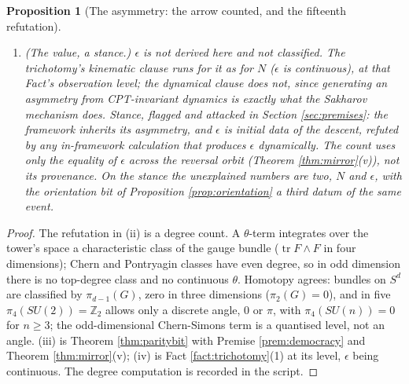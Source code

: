 \documentclass[11pt]{article}
\newtheorem{proposition}[theorem]{Proposition}
\theoremstyle{definition}
\newcommand{\tr}{\operatorname{tr}}
\begin{document}
\begin{proposition}[The asymmetry: the arrow counted, and the fifteenth refutation]
\begin{enumerate}
\item[(iv)] \emph{(The value, a stance.)} $\epsilon$ is not derived here and not classified. The trichotomy's kinematic clause runs for it as for $N$ ($\epsilon$ is continuous), at that Fact's observation level; the dynamical clause does not, since generating an asymmetry from CPT-invariant dynamics is exactly what the Sakharov mechanism does. \emph{Stance, flagged and attacked in Section \ref{sec:premises}:} the framework inherits its asymmetry, and $\epsilon$ is initial data of the descent, refuted by any in-framework calculation that produces $\epsilon$ dynamically. The count uses only the equality of $\epsilon$ across the reversal orbit (Theorem \ref{thm:mirror}(v)), not its provenance. On the stance the unexplained numbers are two, $N$ and $\epsilon$, with the orientation bit of Proposition \ref{prop:orientation} a third datum of the same event.
\end{enumerate}
\end{proposition}

\begin{proof}
The refutation in (ii) is a degree count. A $\theta$-term integrates over the tower's space a characteristic class of the gauge bundle ($\tr F \wedge F$ in four dimensions); Chern and Pontryagin classes have even degree, so in odd dimension there is no top-degree class and no continuous $\theta$. Homotopy agrees: bundles on $S^{d}$ are classified by $\pi_{d-1}(G)$, zero in three dimensions ($\pi_{2}(G) = 0$), and in five $\pi_{4}(SU(2)) = \mathbb{Z}_{2}$ allows only a discrete angle, $0$ or $\pi$, with $\pi_{4}(SU(n)) = 0$ for $n \geq 3$; the odd-dimensional Chern-Simons term is a quantised level, not an angle. (iii) is Theorem \ref{thm:paritybit} with Premise \ref{prem:democracy} and Theorem \ref{thm:mirror}(v); (iv) is Fact \ref{fact:trichotomy}(1) at its level, $\epsilon$ being continuous. The degree computation is recorded in the script.
\end{proof}
\end{document}
